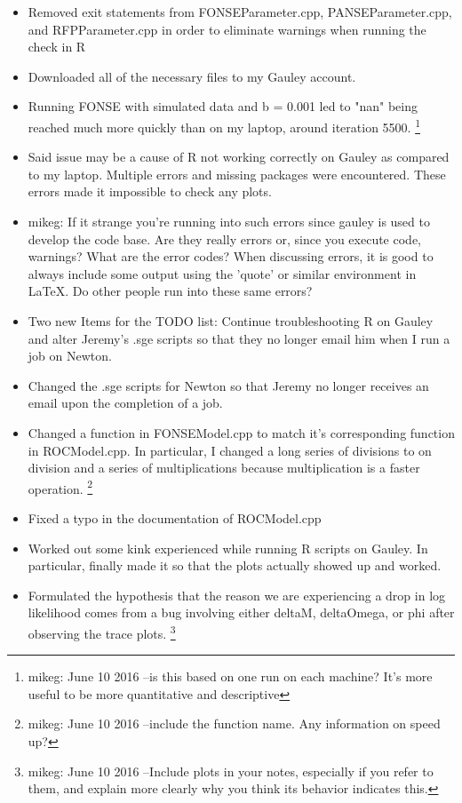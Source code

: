 \documentclass[11pt]{labbook}
\begin{document}
\begin{itemize}
    \item Removed exit statements from FONSEParameter.cpp, PANSEParameter.cpp, and RFPParameter.cpp in order to eliminate warnings when running the check in R
    \item Downloaded all of the necessary files to my Gauley account.
    \item Running FONSE with simulated data and b = 0.001 led to "nan" being reached much more quickly than on my laptop, around iteration 5500.
      \footnote{mikeg: June 10 2016 --is this based on one run on each machine?
        It's more useful to be more quantitative and descriptive} 
    \item Said issue may be a cause of R not working correctly on Gauley as compared to my laptop. 
      Multiple errors and missing packages were encountered. 
      These errors made it impossible to check any plots.
\item{mikeg: If it strange you're running into such errors since gauley is used to develop the code base.
    Are they really errors or, since you execute code, warnings?
    What are the error codes?  
    When discussing errors, it is good to always include some output using the 'quote' or similar environment in \LaTeX.
    Do other people run into these same errors?
  }
    \item Two new Items for the TODO list: Continue troubleshooting R on Gauley and alter Jeremy's .sge scripts so that they no longer email him when I run a job on Newton.
\end{itemize}


\begin{itemize}
    \item Changed the .sge scripts for Newton so that Jeremy no longer receives an email upon the completion of a job.
    \item Changed a function in FONSEModel.cpp to match it's corresponding function in ROCModel.cpp. In particular, I changed a long series of divisions to on division and a series of multiplications because multiplication is a faster operation.
      \footnote{mikeg: June 10 2016 --include the function name. 
        Any information on speed up?
      }
    \item Fixed a typo in the documentation of ROCModel.cpp
    \item Worked out some kink experienced while running R scripts on Gauley. In particular, finally made it so that the plots actually showed up and worked. 
    \item Formulated the hypothesis that the reason we are experiencing a drop in log likelihood comes from a bug involving either deltaM, deltaOmega, or phi after observing the trace plots.
\footnote{mikeg: June 10 2016 --Include plots in your notes, especially if you refer to them, and explain more clearly why you think its behavior indicates this.
}
\end{itemize}
\end{document}
